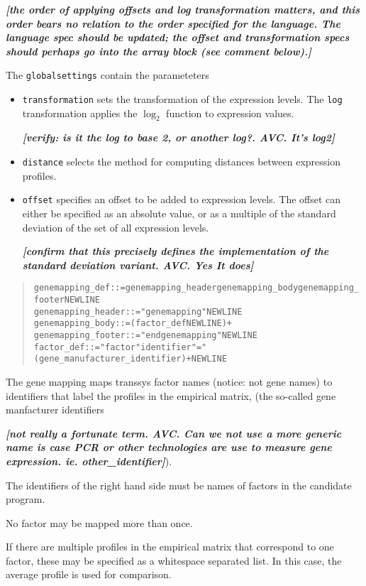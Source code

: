 \documentclass[a4paper,fleqn]{article}
\newcommand{\computercode}[1]{\texttt{#1}}
\newcommand{\todo}[1]{\rule{0pt}{0pt}\marginpar{\rule{1ex}{1ex}}\textbf{\emph{[#1]}}}
\newenvironment{ebnfrule}{\begin{footnotesize}\begin{quote}\begin{alltt}}{\end{alltt}\end{quote}\end{footnotesize}}
\begin{document}
\todo{the order of applying offsets and log transformation matters,
  and this order bears no relation to the order specified for the
  language. The language spec should be updated; the offset and
  transformation specs should perhaps go into the array block (see
  comment below).}

The \computercode{globalsettings} contain the parameteters
\begin{itemize}
\item \computercode{transformation} sets the transformation of the
  expression levels. The \computercode{log} transformation applies the
  $\log_2$ function to expression values. \todo{verify: is it the log
    to base 2, or another log?. AVC. It's log2}
\item \computercode{distance} selects the method for computing
  distances between expression profiles.
\item \computercode{offset} specifies an offset to be added to
  expression levels. The offset can either be specified as an absolute
  value, or as a multiple of the standard deviation of the set of all
  expression levels. \todo{confirm that this precisely defines the
    implementation of the standard deviation variant. AVC. Yes It does}
\end{itemize}

\begin{ebnfrule}
genemapping_def ::= genemapping_header genemapping_body genemapping_footer NEWLINE
genemapping_header ::= "genemapping" NEWLINE
genemapping_body ::= (factor_def NEWLINE)+   
genemapping_footer ::= "endgenemapping" NEWLINE 
factor_def ::= "factor" identifier "=" (gene_manufacturer_identifier)+ NEWLINE
\end{ebnfrule}
The gene mapping maps transsys factor names (notice: not gene names)
to identifiers that label the profiles in the empirical matrix, (the
so-called gene manfacturer identifiers \todo{not really a fortunate
  term. AVC. Can we not use a more generic name is case PCR or other
  technologies are use to measure gene expression. ie.
  other\_identifier}).

The identifiers of the right hand side must be names of factors in the
candidate program.

No factor may be mapped more than once.

If there are multiple profiles in the empirical matrix that correspond to
one factor, these may be specified as a whitespace separated list. In
this case, the average profile is used for comparison.
\end{document}
